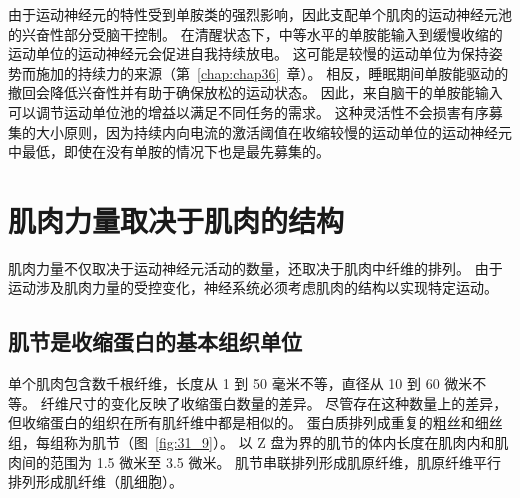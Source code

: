 由于运动神经元的特性受到单胺类的强烈影响，因此支配单个肌肉的运动神经元池的兴奋性部分受脑干控制。
在清醒状态下，中等水平的单胺能输入到缓慢收缩的运动单位的运动神经元会促进自我持续放电。
这可能是较慢的运动单位为保持姿势而施加的持续力的来源（第~\ref{chap:chap36}~章）。
相反，睡眠期间单胺能驱动的撤回会降低兴奋性并有助于确保放松的运动状态。
因此，来自脑干的单胺能输入可以调节运动单位池的增益以满足不同任务的需求。
这种灵活性不会损害有序募集的大小原则，因为持续内向电流的激活阈值在收缩较慢的运动单位的运动神经元中最低，即使在没有单胺的情况下也是最先募集的。



\section{肌肉力量取决于肌肉的结构}

肌肉力量不仅取决于运动神经元活动的数量，还取决于肌肉中纤维的排列。
由于运动涉及肌肉力量的受控变化，神经系统必须考虑肌肉的结构以实现特定运动。



\subsection{肌节是收缩蛋白的基本组织单位}

单个肌肉包含数千根纤维，长度从 1 到 50 毫米不等，直径从 10 到 60 微米不等。
纤维尺寸的变化反映了收缩蛋白数量的差异。
尽管存在这种数量上的差异，但收缩蛋白的组织在所有肌纤维中都是相似的。 
蛋白质排列成重复的粗丝和细丝组，每组称为肌节（图~\ref{fig:31_9}）。
以 Z 盘为界的肌节的体内长度在肌肉内和肌肉间的范围为 1.5 微米至 3.5 微米。
肌节串联排列形成肌原纤维，肌原纤维平行排列形成肌纤维（肌细胞）。



